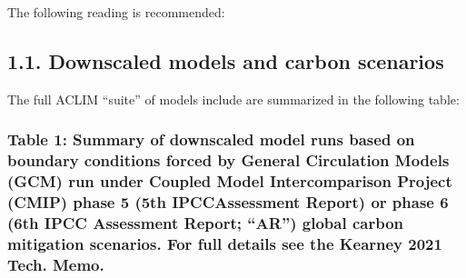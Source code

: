 \documentclass[
]{article}
\begin{document}
The following reading is recommended:

\hypertarget{downscaled-models-and-carbon-scenarios}{%
\subsection{1.1. Downscaled models and carbon
scenarios}\label{downscaled-models-and-carbon-scenarios}}

The full ACLIM ``suite'' of models include are summarized in the
following table:

\hypertarget{table-1-summary-of-downscaled-model-runs-based-on-boundary-conditions-forced-by-general-circulation-models-gcm-run-under-coupled-model-intercomparison-project-cmip-phase-5-5th-ipccassessment-report-or-phase-6-6th-ipcc-assessment-report-ar-global-carbon-mitigation-scenarios.-for-full-details-see-the-kearney-2021-tech.-memo.}{%
\subsubsection{Table 1: Summary of downscaled model runs based on
boundary conditions forced by General Circulation Models (GCM) run under
Coupled Model Intercomparison Project (CMIP) phase 5 (5th IPCCAssessment
Report) or phase 6 (6th IPCC Assessment Report; ``AR'') global carbon
mitigation scenarios. For full details see the Kearney 2021 Tech.
Memo.}\label{table-1-summary-of-downscaled-model-runs-based-on-boundary-conditions-forced-by-general-circulation-models-gcm-run-under-coupled-model-intercomparison-project-cmip-phase-5-5th-ipccassessment-report-or-phase-6-6th-ipcc-assessment-report-ar-global-carbon-mitigation-scenarios.-for-full-details-see-the-kearney-2021-tech.-memo.}}
\end{document}
